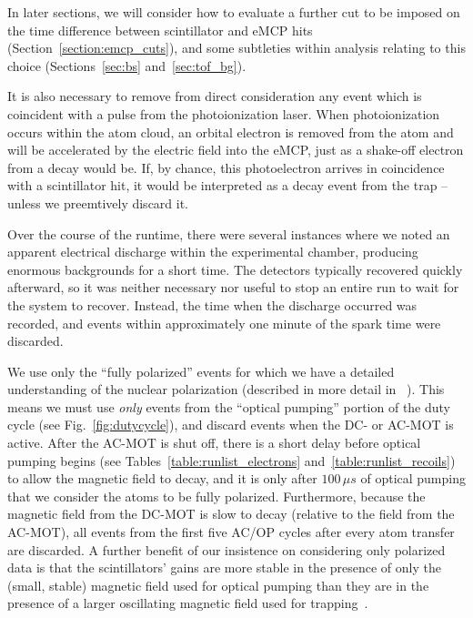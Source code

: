In later sections, we will consider how to evaluate a further cut to be imposed on the time difference between scintillator and eMCP hits (Section~\ref{section:emcp_cuts}), and some subtleties within analysis relating to this choice (Sections~\ref{sec:bs} and~\ref{sec:tof_bg}).

It is also necessary to remove from direct consideration any event which is coincident with a pulse from the photoionization laser.  When photoionization occurs within the atom cloud, an orbital electron is removed from the atom and will be accelerated by the electric field into the eMCP, just as a shake-off electron from a decay would be.  If, by chance, this photoelectron arrives in coincidence with a scintillator hit, it would be interpreted as a decay event from the trap -- unless we preemtively discard it.  

Over the course of the runtime, there were several instances where we noted an apparent electrical discharge within the experimental chamber, producing enormous backgrounds for a short time.  The detectors typically recovered quickly afterward, so it was neither necessary nor useful to stop an entire run to wait for the system to recover.  Instead, the time when the discharge occurred was recorded, and events within approximately one minute of the spark time were discarded.  

We use only the ``fully polarized'' events for which we have a detailed understanding of the nuclear polarization (described in more detail in ~\cite{ben_OP}).  This means we must use \emph{only} events from the ``optical pumping'' portion of the duty cycle (see Fig.~\ref{fig:dutycycle}), and discard events when the DC- or AC-MOT is active.  After the AC-MOT is shut off, there is a short delay before optical pumping begins (see Tables~\ref{table:runlist_electrons} and~\ref{table:runlist_recoils}) to allow the magnetic field to decay, and it is only after $100\,\mu s$ of optical pumping that we consider the atoms to be fully polarized.  Furthermore, because the magnetic field from the DC-MOT is slow to decay (relative to the field from the AC-MOT), all events from the first five AC/OP cycles after every atom transfer are discarded.  A further benefit of our insistence on considering only polarized data is that the scintillators' gains are more stable in the presence of only the (small, stable) magnetic field used for optical pumping than they are in the presence of a larger oscillating magnetic field used for trapping~\cite{ben_thesis}.

